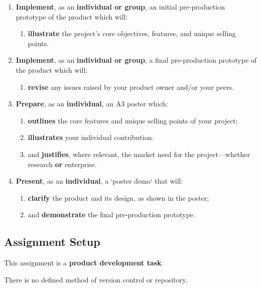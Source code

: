 \documentclass{../../fal_assignment}
\begin{document}
\begin{enumerate}[label=(\Alph*)]
    \item \textbf{Implement}, as an \textbf{individual or group}, an initial pre-production prototype of the product which will:
    	\begin{enumerate}[label=\roman*.]
    		\item \textbf{illustrate} the project's core objectives, features, and unique selling points.
	\end{enumerate}
    \item \textbf{Implement}, as an \textbf{individual or group}, a final pre-production prototype of the product which will:
    	\begin{enumerate}[label=\roman*.]
    		\item \textbf{revise} any issues raised by your product owner and/or your peers.
	\end{enumerate}
    \item \textbf{Prepare}, as an \textbf{individual}, an A3 poster which:
    	\begin{enumerate}[label=\roman*.]
    		\item \textbf{outlines} the core features and unique selling points of your project;
		\item \textbf{illustrates} your individual contribution.
    		\item and \textbf{justifies}, where relevant, the market need for the project---whether research \textbf{or} enterprise.
	\end{enumerate}
    \item \textbf{Present}, as an \textbf{individual}, a `poster demo` that will:
    	\begin{enumerate}[label=\roman*.]
    		\item \textbf{clarify} the product and its design, as shown in the poster;
    		\item and \textbf{demonstrate} the final pre-production prototype.
	\end{enumerate}
\end{enumerate}

\subsection*{Assignment Setup}

This assignment is a \textbf{product development task}.

There is no defined method of version control or repository.
\end{document}
